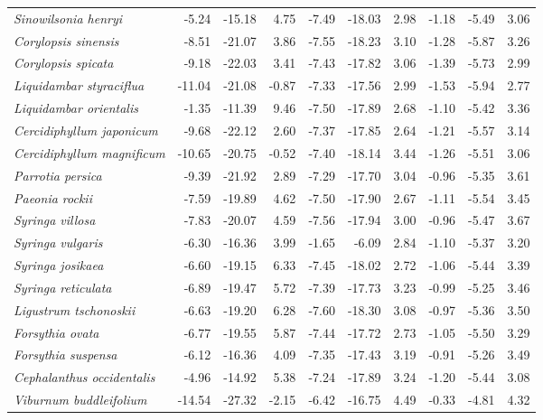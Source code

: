 \documentclass[11pt]{article}
\begin{document}
\begin{longtable}{lrrrrrrrrr}
  \emph{Sinowilsonia henryi} & -5.24 & -15.18 & 4.75 & -7.49 & -18.03 & 2.98 & -1.18 & -5.49 & 3.06 \\ 
  \emph{Corylopsis sinensis} & -8.51 & -21.07 & 3.86 & -7.55 & -18.23 & 3.10 & -1.28 & -5.87 & 3.26 \\ 
  \emph{Corylopsis spicata} & -9.18 & -22.03 & 3.41 & -7.43 & -17.82 & 3.06 & -1.39 & -5.73 & 2.99 \\ 
  \emph{Liquidambar styraciflua} & -11.04 & -21.08 & -0.87 & -7.33 & -17.56 & 2.99 & -1.53 & -5.94 & 2.77 \\ 
  \emph{Liquidambar orientalis} & -1.35 & -11.39 & 9.46 & -7.50 & -17.89 & 2.68 & -1.10 & -5.42 & 3.36 \\ 
  \emph{Cercidiphyllum japonicum} & -9.68 & -22.12 & 2.60 & -7.37 & -17.85 & 2.64 & -1.21 & -5.57 & 3.14 \\ 
  \emph{Cercidiphyllum magnificum} & -10.65 & -20.75 & -0.52 & -7.40 & -18.14 & 3.44 & -1.26 & -5.51 & 3.06 \\ 
  \emph{Parrotia persica} & -9.39 & -21.92 & 2.89 & -7.29 & -17.70 & 3.04 & -0.96 & -5.35 & 3.61 \\ 
  \emph{Paeonia rockii} & -7.59 & -19.89 & 4.62 & -7.50 & -17.90 & 2.67 & -1.11 & -5.54 & 3.45 \\ 
  \emph{Syringa villosa} & -7.83 & -20.07 & 4.59 & -7.56 & -17.94 & 3.00 & -0.96 & -5.47 & 3.67 \\ 
  \emph{Syringa vulgaris} & -6.30 & -16.36 & 3.99 & -1.65 & -6.09 & 2.84 & -1.10 & -5.37 & 3.20 \\ 
  \emph{Syringa josikaea} & -6.60 & -19.15 & 6.33 & -7.45 & -18.02 & 2.72 & -1.06 & -5.44 & 3.39 \\ 
  \emph{Syringa reticulata} & -6.89 & -19.47 & 5.72 & -7.39 & -17.73 & 3.23 & -0.99 & -5.25 & 3.46 \\ 
  \emph{Ligustrum tschonoskii} & -6.63 & -19.20 & 6.28 & -7.60 & -18.30 & 3.08 & -0.97 & -5.36 & 3.50 \\ 
  \emph{Forsythia ovata} & -6.77 & -19.55 & 5.87 & -7.44 & -17.72 & 2.73 & -1.05 & -5.50 & 3.29 \\ 
  \emph{Forsythia suspensa} & -6.12 & -16.36 & 4.09 & -7.35 & -17.43 & 3.19 & -0.91 & -5.26 & 3.49 \\ 
  \emph{Cephalanthus occidentalis} & -4.96 & -14.92 & 5.38 & -7.24 & -17.89 & 3.24 & -1.20 & -5.44 & 3.08 \\ 
  \emph{Viburnum buddleifolium} & -14.54 & -27.32 & -2.15 & -6.42 & -16.75 & 4.49 & -0.33 & -4.81 & 4.32 \\ 

\end{longtable}
\end{document}
